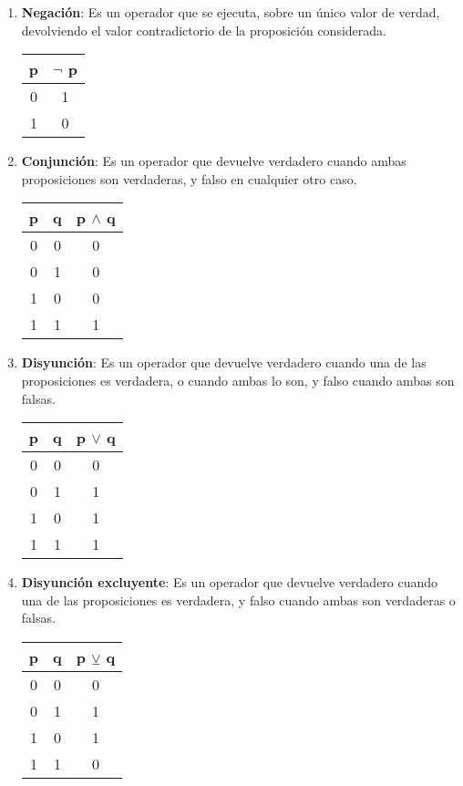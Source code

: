 \documentclass[a4paper, twoside]{article}
\begin{document}
\begin{enumerate}
	\item \textbf{Negación}: Es un operador que se ejecuta, sobre un único 
	valor de verdad, devolviendo el valor contradictorio de la proposición 
	considerada.
		\begin{center}
			\begin{tabular}{|c|c|}
			\hline
			\textbf{p} & $\lnot$ \textbf{p} \\
			\cline{0 - 1}
			\hline
			0 & 1 \\
			1 & 0 \\
			\hline
			\end{tabular}
		\end{center}

	\item \textbf{Conjunción}: Es un operador que devuelve verdadero cuando 
	ambas proposiciones son verdaderas, y falso en cualquier otro caso.
		\begin{center}
			\begin{tabular}{|c|c|c|}
			\hline
			\textbf{p} & \textbf{q} & \textbf{p} $\wedge$ \textbf{q}\\
			\cline{0 - 1}
			\hline
			0 & 0 & 0\\
			0 & 1 & 0\\
			1 & 0 & 0\\
			1 & 1 & 1\\
			\hline
			\end{tabular}
		\end{center}

	\item \textbf{Disyunción}: Es un operador que devuelve verdadero cuando 
	una de las proposiciones es verdadera, o cuando ambas lo son, y falso 
	cuando ambas son falsas.
		\begin{center}
			\begin{tabular}{|c|c|c|}
			\hline
			\textbf{p} & \textbf{q} & \textbf{p} $\lor$ \textbf{q}\\
			\cline{0 - 1}
			\hline
			0 & 0 & 0\\
			0 & 1 & 1\\
			1 & 0 & 1\\
			1 & 1 & 1\\
			\hline
			\end{tabular}
		\end{center}

	\item \textbf{Disyunción excluyente}: Es un operador que devuelve 
	verdadero cuando una de las proposiciones es verdadera, y falso cuando 
	ambas son verdaderas o falsas.
		\begin{center}
			\begin{tabular}{|c|c|c|}
			\hline
			\textbf{p} & \textbf{q} & \textbf{p} $\veebar$ \textbf{q}\\
			\cline{0 - 1}
			\hline
			0 & 0 & 0\\
			0 & 1 & 1\\
			1 & 0 & 1\\
			1 & 1 & 0\\
			\hline
			\end{tabular}
		\end{center}


\end{enumerate}
\end{document}
